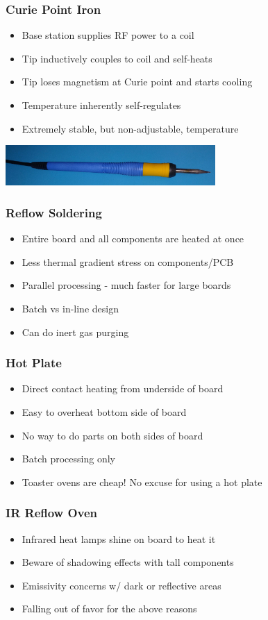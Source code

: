 \documentclass{beamer}
\begin{document}
\begin{frame}
\frametitle{Curie Point Iron}
\begin{itemize}
\item Base station supplies RF power to a coil
\item Tip inductively couples to coil and self-heats
\item Tip loses magnetism at Curie point and starts cooling
\item Temperature inherently self-regulates
\item Extremely stable, but non-adjustable, temperature
\end{itemize}
\begin{center}
\includegraphics[width=8cm,keepaspectratio]{curie-iron.jpg}
\end{center}
\end{frame}

\begin{frame}
\frametitle{Reflow Soldering}
\begin{itemize}
\item Entire board and all components are heated at once
\item Less thermal gradient stress on components/PCB
\item Parallel processing - much faster for large boards
\item Batch vs in-line design
\item Can do inert gas purging
\end{itemize}
\end{frame}

\begin{frame}
\frametitle{Hot Plate}
\begin{itemize}
\item Direct contact heating from underside of board
\item Easy to overheat bottom side of board
\item No way to do parts on both sides of board
\item Batch processing only
\item Toaster ovens are cheap! No excuse for using a hot plate
\end{itemize}
\end{frame}

\begin{frame}
\frametitle{IR Reflow Oven}
\begin{itemize}
\item Infrared heat lamps shine on board to heat it
\item Beware of shadowing effects with tall components
\item Emissivity concerns w/ dark or reflective areas
\item Falling out of favor for the above reasons
\end{itemize}
\end{frame}
\end{document}
